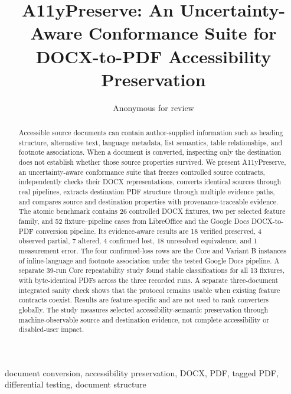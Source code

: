 \documentclass[conference]{IEEEtran}
\title{A11yPreserve: An Uncertainty-Aware Conformance Suite for DOCX-to-PDF Accessibility Preservation}
\author{Anonymous for review}
\begin{document}
\maketitle

\begin{abstract}
Accessible source documents can contain author-supplied information such as heading structure, alternative text, language metadata, list semantics, table relationships, and footnote associations. When a document is converted, inspecting only the destination does not establish whether those source properties survived. We present A11yPreserve, an uncertainty-aware conformance suite that freezes controlled source contracts, independently checks their DOCX representations, converts identical sources through real pipelines, extracts destination PDF structure through multiple evidence paths, and compares source and destination properties with provenance-traceable evidence. The atomic benchmark contains 26 controlled DOCX fixtures, two per selected feature family, and 52 fixture--pipeline cases from LibreOffice and the Google Docs DOCX-to-PDF conversion pipeline. Its evidence-aware results are 18 verified preserved, 4 observed partial, 7 altered, 4 confirmed lost, 18 unresolved equivalence, and 1 measurement error. The four confirmed-loss rows are the Core and Variant B instances of inline-language and footnote association under the tested Google Docs pipeline. A separate 39-run Core repeatability study found stable classifications for all 13 fixtures, with byte-identical PDFs across the three recorded runs. A separate three-document integrated sanity check shows that the protocol remains usable when existing feature contracts coexist. Results are feature-specific and are not used to rank converters globally. The study measures selected accessibility-semantic preservation through machine-observable source and destination evidence, not complete accessibility or disabled-user impact.
\end{abstract}

\begin{IEEEkeywords}
document conversion, accessibility preservation, DOCX, PDF, tagged PDF, differential testing, document structure
\end{IEEEkeywords}









\end{document}
